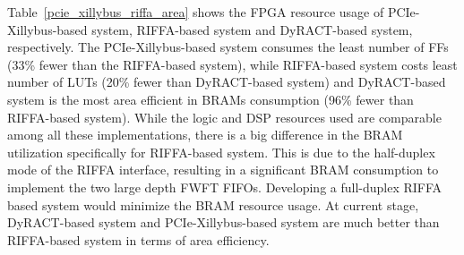 Table~\ref{pcie_xillybus_riffa_area} shows the FPGA resource usage of PCIe-Xillybus-based system, RIFFA-based system and DyRACT-based system, respectively. 
The PCIe-Xillybus-based system consumes the least number of FFs (33\% fewer than the RIFFA-based system), while RIFFA-based system costs least number of LUTs (20\% fewer than DyRACT-based system) and DyRACT-based system is the most area efficient in BRAMs consumption (96\% fewer than RIFFA-based system). 
While the logic and DSP resources used are comparable among all these implementations, there is a big difference in the BRAM utilization specifically for RIFFA-based system. 
This is due to the half-duplex mode of the RIFFA interface, resulting in a significant BRAM consumption to implement the two large depth FWFT FIFOs. 
Developing a full-duplex RIFFA based system would minimize the BRAM resource usage. 
At current stage, DyRACT-based system and PCIe-Xillybus-based system are much better than RIFFA-based system in terms of area efficiency. 

\begin{table}[tb]
	\caption{Area overhead of PCIe-based systems.}
	\label{pcie_xillybus_riffa_area}
	\centering
\end{table}
